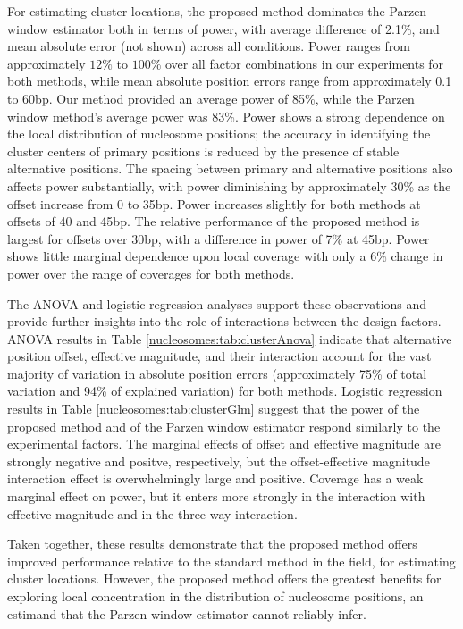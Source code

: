 For estimating cluster locations, the proposed method dominates the Parzen-window estimator both in terms of power, with average difference of 2.1\%, and mean absolute error (not shown) across all conditions.
Power ranges from approximately $12\%$ to $100\%$ over all factor combinations in our experiments for both methods, while mean absolute position errors range from approximately 0.1 to 60bp.
Our method provided an average power of 85\%, while the Parzen window method's average power was 83\%.
Power shows a strong dependence on the local distribution of nucleosome positions; the accuracy in identifying the cluster centers of primary positions is reduced by the presence of stable alternative positions.
The spacing between primary and alternative positions also affects power substantially, with power diminishing by approximately 30\% as the offset increase from 0 to 35bp.
Power increases slightly for both methods at offsets of 40 and 45bp.
The relative performance of the proposed method is largest for offsets over 30bp, with a difference in power of 7\% at 45bp.
Power shows little marginal dependence upon local coverage with only a 6\% change in power over the range of coverages for both methods.

The ANOVA and logistic regression analyses support these observations and provide further insights into the role of interactions between the design factors.
ANOVA results in Table \ref{nucleosomes:tab:clusterAnova} indicate that alternative position offset, effective magnitude, and their interaction account for the vast majority of variation in absolute position errors (approximately 75\% of total variation and 94\% of explained variation) for both methods.
Logistic regression results in Table \ref{nucleosomes:tab:clusterGlm} suggest that the power of the proposed method and of the Parzen window estimator respond similarly to the experimental factors.
The marginal effects of offset and effective magnitude are strongly negative and positve, respectively, but the offset-effective magnitude interaction effect is overwhelmingly large and positive.
Coverage has a weak marginal effect on power, but it enters more strongly in the interaction with effective magnitude and in the three-way interaction.

Taken together, these results demonstrate that the proposed method offers improved performance relative to the standard method in the field, for estimating cluster locations.
However, the proposed method offers the greatest benefits for exploring  local concentration in the distribution of nucleosome positions, an estimand that the Parzen-window estimator cannot reliably infer.

